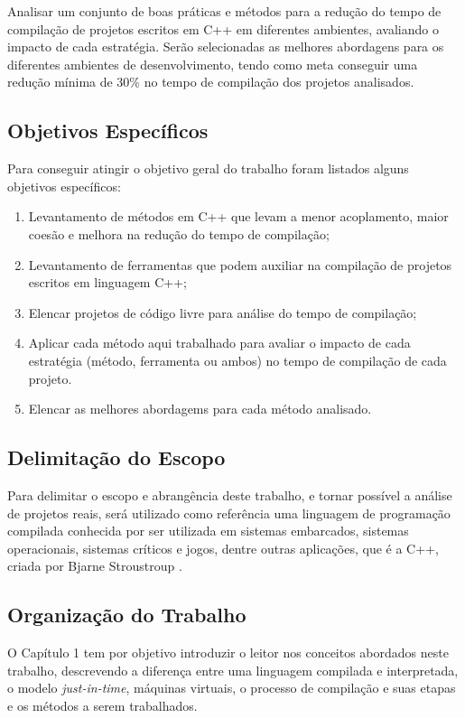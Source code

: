 Analisar um conjunto de boas práticas e métodos para a redução do
 tempo de compilação de projetos escritos em C++ em diferentes ambientes,
 avaliando o impacto de cada estratégia.
 Serão selecionadas as melhores abordagens
 para os diferentes ambientes de desenvolvimento, tendo como meta conseguir uma
 redução mínima de 30\% no tempo de compilação dos projetos analisados. 

\subsection*{Objetivos Específicos}

Para conseguir atingir o objetivo geral do trabalho foram listados
 alguns objetivos específicos:

\begin{enumerate}
    \item Levantamento de métodos em C++ que levam a menor acoplamento,
 maior coesão e melhora na redução do tempo de compilação;
    \item Levantamento de ferramentas que podem auxiliar na compilação
 de projetos escritos em linguagem C++;
    \item Elencar projetos de código livre para análise do tempo de
 compilação;
    \item Aplicar cada método aqui trabalhado para avaliar o impacto de cada
 estratégia (método, ferramenta ou ambos) no tempo de compilação de
 cada projeto.
    \item Elencar as melhores abordagems para cada método analisado.
\end{enumerate}


\subsection*{Delimitação do Escopo}

Para delimitar o escopo e abrangência deste trabalho, e tornar possível
 a análise de projetos reais, será utilizado como referência uma linguagem
 de programação compilada conhecida por ser utilizada em sistemas embarcados,
 sistemas operacionais, sistemas críticos e jogos, dentre outras aplicações,
 que é a C++, criada por Bjarne Stroustroup \cite{BjarneC++}.

\subsection*{Organização do Trabalho}

O Capítulo 1 tem por objetivo introduzir o leitor nos conceitos abordados
 neste trabalho, descrevendo a diferença entre uma linguagem compilada e
 interpretada, o modelo \textit{just-in-time}, máquinas virtuais, o processo de compilação
 e suas etapas e os métodos a serem trabalhados.

